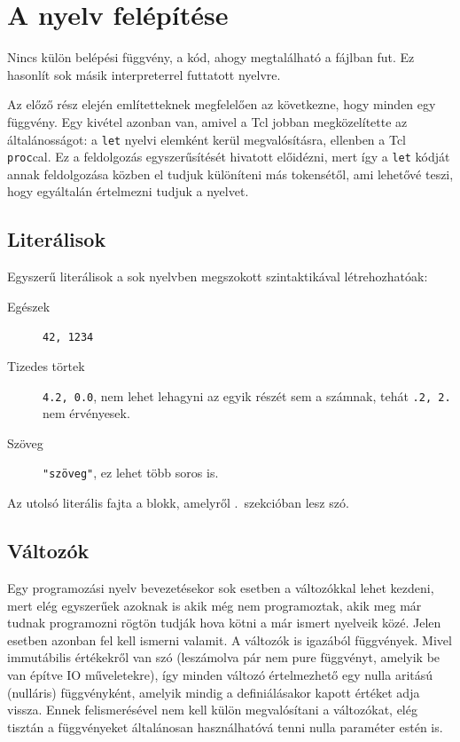 \documentclass[magyar,12pt,a4paper,final,titlepage]{report}
\def\inlcode#1{{\color{inline-code-color}\tt #1}}
\begin{document}
    \section{A nyelv felépítése}

    Nincs külön belépési függvény, a kód, ahogy megtalálható a fájlban fut.
    Ez hasonlít sok másik interpreterrel futtatott nyelvre.

    Az előző rész elején említetteknek megfelelően az következne, hogy minden egy függvény.
    Egy kivétel azonban van, amivel a Tcl jobban megközelítette az általánosságot: a \inlcode{let} nyelvi elemként kerül megvalósításra, ellenben a Tcl \inlcode{proc}cal.
    Ez a feldolgozás egyszerűsítését hivatott előidézni, mert így a \inlcode{let} kódját annak feldolgozása közben el tudjuk különíteni más \glspl{token}étől, ami lehetővé teszi, hogy egyáltalán értelmezni tudjuk a nyelvet.

    \subsection{Literálisok}

    Egyszerű literálisok a sok nyelvben megszokott szintaktikával létrehozhatóak:
    \begin{description}
        \item[Egészek] {\tt 42,~1234}
        \item[Tizedes törtek] {\tt 4.2,~0.0}, nem lehet lehagyni az egyik részét sem a számnak, tehát {\tt .2,~2.} nem érvényesek.
        \item[Szöveg] {\tt "szöveg"}, ez lehet több soros is.
    \end{description}

    \noindent Az utolsó literális fajta a blokk, amelyről .~szekcióban lesz szó.

    \subsection{Változók}

    Egy programozási nyelv bevezetésekor sok esetben a változókkal lehet kezdeni, mert elég egyszerűek azoknak is akik még nem programoztak, akik meg már tudnak programozni rögtön tudják hova kötni a már ismert nyelveik közé.
    Jelen esetben azonban fel kell ismerni valamit.
    A változók is igazából függvények.
    Mivel immutábilis értékekről van szó (leszámolva pár nem \gls{pure} függvényt, amelyik be van építve IO műveletekre), így minden változó értelmezhető egy nulla aritású (nulláris) függvényként, amelyik mindig a definiálásakor kapott értéket adja vissza.
    Ennek felismerésével nem kell külön megvalósítani a változókat, elég tisztán a függvényeket általánosan használhatóvá tenni nulla paraméter estén is.
\end{document}
